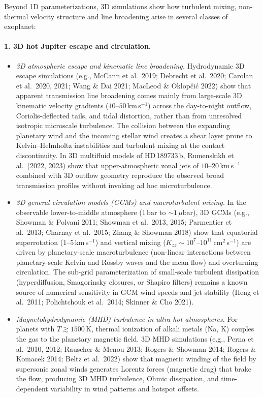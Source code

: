\documentclass[english,a4paper]{my_memo}
\begin{document}
Beyond 1D parameterizations, 3D simulations show how turbulent mixing,
non-thermal velocity structure and line broadening arise in several classes
of exoplanet:

\paragraph{1. 3D hot Jupiter escape and circulation.}
\begin{itemize}
\item \emph{3D atmospheric escape and kinematic line broadening.}
      Hydrodynamic 3D escape simulations (e.g., McCann et al.\ 2019;
      Debrecht et al.\ 2020; Carolan et al.\ 2020, 2021; Wang \& Dai 2021;
      MacLeod \& Oklop\v{c}i\'c 2022) show that apparent transmission
      line broadening comes mainly from large-scale 3D kinematic velocity
      gradients ($10$--$50$\,km\,s$^{-1}$) across the day-to-night outflow,
      Coriolis-deflected tails, and tidal distortion, rather than from
      unresolved isotropic microscale turbulence. The collision between the
      expanding planetary wind and the incoming stellar wind creates a shear
      layer prone to Kelvin--Helmholtz instabilities and turbulent mixing at
      the contact discontinuity. In 3D multifluid models of HD\,189733\,b,
      Rumenskikh et al.\ (2022, 2023) show that upper-atmospheric zonal jets
      of $10$--$20$\,km\,s$^{-1}$ combined with 3D outflow geometry reproduce
      the observed broad transmission profiles without invoking ad hoc
      microturbulence.
\item \emph{3D general circulation models (GCMs) and macroturbulent mixing.}
      In the observable lower-to-middle atmosphere ($1\,\mathrm{bar}$ to
      $\sim 1\,\mu\mathrm{bar}$), 3D GCMs (e.g., Showman \& Polvani 2011;
      Showman et al.\ 2013, 2015; Parmentier et al.\ 2013; Charnay et al.\
      2015; Zhang \& Showman 2018) show that equatorial superrotation
      ($1$--$5$\,km\,s$^{-1}$) and vertical mixing ($K_{zz} \sim
      10^7$--$10^{11}$\,cm$^2$\,s$^{-1}$) are driven by planetary-scale
      macroturbulence (non-linear interactions between planetary-scale Kelvin
      and Rossby waves and the mean flow) and overturning circulation. The
      sub-grid parameterization of small-scale turbulent dissipation
      (hyperdiffusion, Smagorinsky closures, or Shapiro filters) remains a
      known source of numerical sensitivity in GCM wind speeds and jet
      stability (Heng et al.\ 2011; Polichtchouk et al.\ 2014; Skinner \& Cho
      2021).
\item \emph{Magnetohydrodynamic (MHD) turbulence in ultra-hot atmospheres.}
      For planets with $T \gtrsim 1500$\,K, thermal ionization of alkali
      metals (Na, K) couples the gas to the planetary magnetic field. 3D MHD
      simulations (e.g., Perna et al.\ 2010, 2012; Rauscher \& Menou 2013;
      Rogers \& Showman 2014; Rogers \& Komacek 2014; Beltz et al.\ 2022)
      show that magnetic winding of the field by supersonic zonal winds
      generates Lorentz forces (magnetic drag) that brake the flow, producing
      3D MHD turbulence, Ohmic dissipation, and time-dependent variability in
      wind patterns and hotspot offsets.
\end{itemize}
\end{document}
